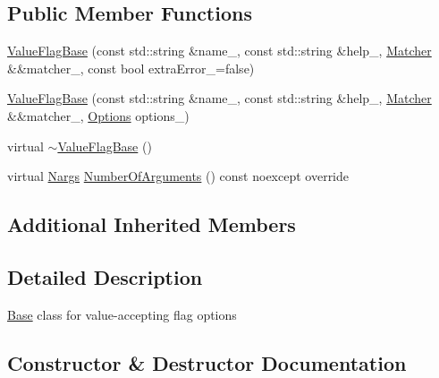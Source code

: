 \subsection*{Public Member Functions}
\begin{DoxyCompactItemize}
\item 
\hyperlink{classargs_1_1_value_flag_base_a7bfdb118146f73ea090bcbeeab2d0b4d}{Value\+Flag\+Base} (const std\+::string \&name\+\_\+, const std\+::string \&help\+\_\+, \hyperlink{classargs_1_1_matcher}{Matcher} \&\&matcher\+\_\+, const bool extra\+Error\+\_\+=false)
\item 
\hyperlink{classargs_1_1_value_flag_base_ae918b548302f28920fa14da64553277c}{Value\+Flag\+Base} (const std\+::string \&name\+\_\+, const std\+::string \&help\+\_\+, \hyperlink{classargs_1_1_matcher}{Matcher} \&\&matcher\+\_\+, \hyperlink{namespaceargs_aa530c0f95194aa275f49a5f299ac9e77}{Options} options\+\_\+)
\item 
virtual \hyperlink{classargs_1_1_value_flag_base_afc86f873e2a3fb8dd5ff30176fa5be55}{$\sim$\+Value\+Flag\+Base} ()
\item 
virtual \hyperlink{structargs_1_1_nargs}{Nargs} \hyperlink{classargs_1_1_value_flag_base_a96a10bfb949ad175dcf2ffba6a6ec3b6}{Number\+Of\+Arguments} () const noexcept override
\end{DoxyCompactItemize}
\subsection*{Additional Inherited Members}


\subsection{Detailed Description}
\hyperlink{classargs_1_1_base}{Base} class for value-\/accepting flag options 

\subsection{Constructor \& Destructor Documentation}
\mbox{\label{classargs_1_1_value_flag_base_a7bfdb118146f73ea090bcbeeab2d0b4d}} 
